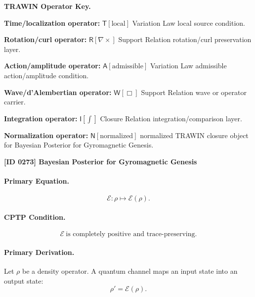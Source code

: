 \par\vspace{0.45\baselineskip}
\noindent\begin{minipage}[t]{\linewidth}
\begingroup
\small
\raggedright
\textbf{TRAWIN Operator Key.}\par
\noindent\textbf{Time/localization operator:} $\mathsf{T}\!\left[\mathrm{local}\right]$ Variation Law local source condition.\par
\noindent\textbf{Rotation/curl operator:} $\mathsf{R}\!\left[\nabla\times\right]$ Support Relation rotation/curl preservation layer.\par
\noindent\textbf{Action/amplitude operator:} $\mathsf{A}\!\left[\mathrm{admissible}\right]$ Variation Law admissible action/amplitude condition.\par
\noindent\textbf{Wave/d'Alembertian operator:} $\mathsf{W}\!\left[\Box\right]$ Support Relation wave or operator carrier.\par
\noindent\textbf{Integration operator:} $\mathsf{I}\!\left[\int\right]$ Closure Relation integration/comparison layer.\par
\noindent\textbf{Normalization operator:} $\mathsf{N}\!\left[\mathrm{normalized}\right]$ normalized TRAWIN closure object for Bayesian Posterior for Gyromagnetic Genesis.\par
\endgroup
\end{minipage}

\clearpage
\noindent\textbf{[ID 0273] Bayesian Posterior for Gyromagnetic Genesis}\par
\vspace{0.35em}
\paragraph{Primary Equation.}
\begin{equation}
\mathcal{E}:\rho\mapsto \mathcal{E}(\rho).
\end{equation}

\paragraph{CPTP Condition.}
\begin{equation}
\mathcal{E}\ \text{is completely positive and trace-preserving}.
\end{equation}

\paragraph{Primary Derivation.}
Let $\rho$ be a density operator. A quantum channel maps an input state into an output state:
\begin{equation}
\rho'=\mathcal{E}(\rho).
\end{equation}

